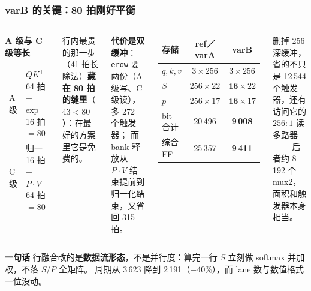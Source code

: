 \documentclass[10pt,aspectratio=43,mathserif]{beamer}
\begin{document}
\begin{frame}[t]
\frametitle{\textbf{varB 的关键：80 拍刚好平衡}}
\begin{columns}[t,onlytextwidth]
  \scriptsize
  \begin{block}{\textbf{\scriptsize A 级与 C 级等长}}
    \begin{tabular}{ll}
      A 级 & $QK^{\top}$ 64 拍 $+$ exp 16 拍 $=80$\\
      C 级 & 归一 16 拍 $+$ $P\cdot V$ 64 拍 $=80$\\
    \end{tabular}
  \end{block}
  行内最贵的那一步（41 拍长除法）\textbf{藏在 80 拍的缝里}（$43<80$）：在最好的方案里它是免费的。
  \vspace{1mm}

  \textbf{代价是双缓冲}：\texttt{erow} 要两份（A 级写、C 级读），多 272 个触发器；
  而 bank 释放从 $P\cdot V$ 结束提前到归一化结束，又省回 315 拍。
  \scriptsize
  \begin{center}
  \begin{tabular}{lcc}
    \toprule
    存储 & ref／varA & varB \\
    \midrule
    $q,k,v$ & $3\times256$ & $3\times256$ \\
    $S$ & $256\times22$ & $\mathbf{16}\times22$ \\
    $p$ & $256\times17$ & $\mathbf{16}\times17$ \\
    \midrule
    bit 合计 & 20\,496 & \textbf{9\,008} \\
    综合 FF & 25\,357 & \textbf{9\,411} \\
    \bottomrule
  \end{tabular}
  \end{center}
  \vspace{-0.5mm}
  {\tiny 删掉 256 深缓冲，省的不只是 12\,544 个触发器，还有访问它的 $256:1$ 读多路器——
  后者约 8\,192 个 mux2，面积和触发器本身相当。}
\end{columns}
\vspace{1mm}
\begin{block}{\textbf{\scriptsize 一句话}}
  \scriptsize
  行融合改的是\textbf{数据流形态}，不是并行度：算完一行 $S$ 立刻做 softmax 并加权，不落 $S/P$ 全矩阵。
  周期从 3\,623 降到 2\,191（$-40\%$），而 lane 数与数值格式一位没动。
\end{block}
\end{frame}

\end{document}
